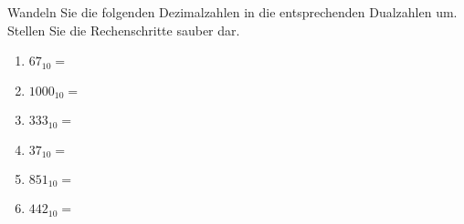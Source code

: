 \begin{exercise}
Wandeln Sie die folgenden Dezimalzahlen in die entsprechenden Dualzahlen um. Stellen Sie die Rechenschritte sauber dar.

\begin{multicols}{2}
\begin{enumerate}

\item $67_{10} = $ \\
\begin{minipage}{\linewidth}
\centering
\fillwithgrid{2.25in}
\end{minipage}

\item $1000_{10} = $ \\
\begin{minipage}{\linewidth}
\centering
\fillwithgrid{2.75in}
\end{minipage}

\item $333_{10} = $ \\
\begin{minipage}{\linewidth}
\centering
\fillwithgrid{2.75in}
\end{minipage}

\item $37_{10} = $ \\
\begin{minipage}{\linewidth}
\centering
\fillwithgrid{2.25in}
\end{minipage}

\item $851_{10} = $ \\
\begin{minipage}{\linewidth}
\centering
\fillwithgrid{2.75in}
\end{minipage}

\item $442_{10} = $ \\
\begin{minipage}{\linewidth}
\centering
\fillwithgrid{2.75in}
\end{minipage}

\end{enumerate}
\end{multicols}
\end{exercise}

